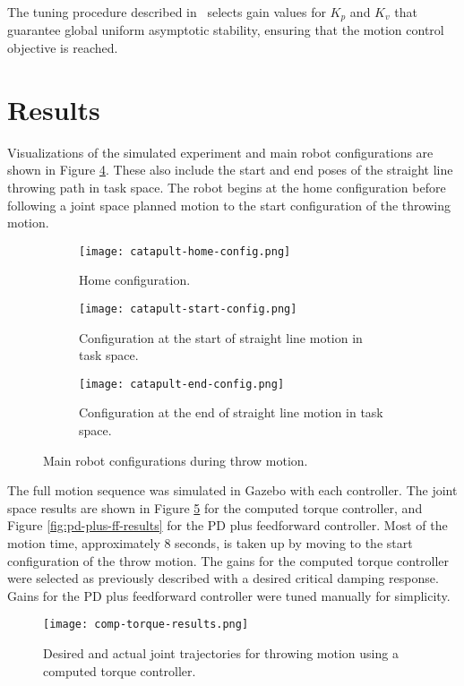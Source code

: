 \documentclass[conference]{IEEEtran}
\begin{document}
The tuning procedure described in~\cite{kelly2007control} selects gain values for $K_p$
and $K_v$ that guarantee global uniform asymptotic stability, ensuring that the
motion control objective is reached.


\section{Results}
Visualizations of the simulated experiment and main robot configurations are
shown in Figure \ref{fig:configs}. These also include the start and end poses of
the straight line throwing path in task space. The robot begins at the home
configuration before following a joint space planned motion to the start
configuration of the throwing motion.

\begin{figure}[!t]
  \begin{subfigure}{0.24\textwidth}
    \texttt{[image: catapult-home-config.png]}
    \caption{Home configuration.}
    \label{fig:home-config}
  \end{subfigure}
  \begin{subfigure}{0.24\textwidth}
    \texttt{[image: catapult-start-config.png]}
    \caption{Configuration at the start of straight line motion in task space.}
    \label{fig:start-config}
  \end{subfigure}
  \begin{subfigure}{0.24\textwidth}
    \texttt{[image: catapult-end-config.png]}
    \caption{Configuration at the end of straight line motion in task space.}
    \label{fig:end-config}
  \end{subfigure}
  \caption{Main robot configurations during throw motion.}
  \label{fig:configs}
\end{figure}

The full motion sequence was simulated in Gazebo with each controller. The joint
space results are shown in Figure \ref{fig:comp-torque-results} for the computed
torque controller, and Figure \ref{fig:pd-plus-ff-results} for the PD plus
feedforward controller. Most of the motion time, approximately $8$ seconds, is
taken up by moving to the start configuration of the throw motion. The gains for
the computed torque controller were selected as previously described with a
desired critical damping response. Gains for the PD plus feedforward controller
were tuned manually for simplicity.

\begin{figure}[!t]
  \texttt{[image: comp-torque-results.png]}
  \caption{Desired and actual joint trajectories for throwing motion using a computed torque controller.}
  \label{fig:comp-torque-results}
\end{figure}
\end{document}
